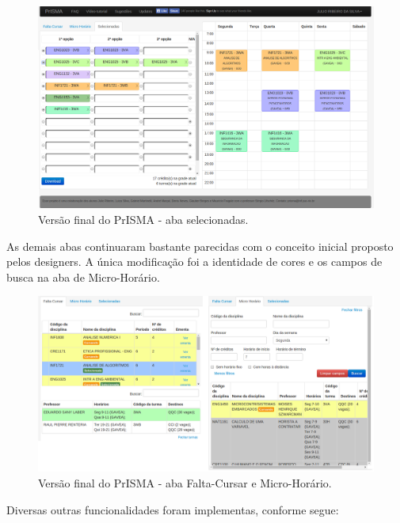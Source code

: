 \documentclass[graduacao,brazil]{ThesisPUC}
\begin{document}
\begin{figure}[H]
    \centering
    \includegraphics[width=\linewidth]{img/v3_selecionadas.png}
    \caption{Versão final do PrISMA - aba selecionadas.}
\end{figure}

As demais abas continuaram bastante parecidas com o conceito inicial proposto pelos designers. A única modificação foi a identidade de cores e os campos de busca na aba de Micro-Horário.

\begin{figure}[H]
    \centering
    \includegraphics[width=\linewidth]{img/v3_abas.png}
    \caption{Versão final do PrISMA - aba Falta-Cursar e Micro-Horário.}
\end{figure}

Diversas outras funcionalidades foram implementas, conforme segue:
\end{document}
